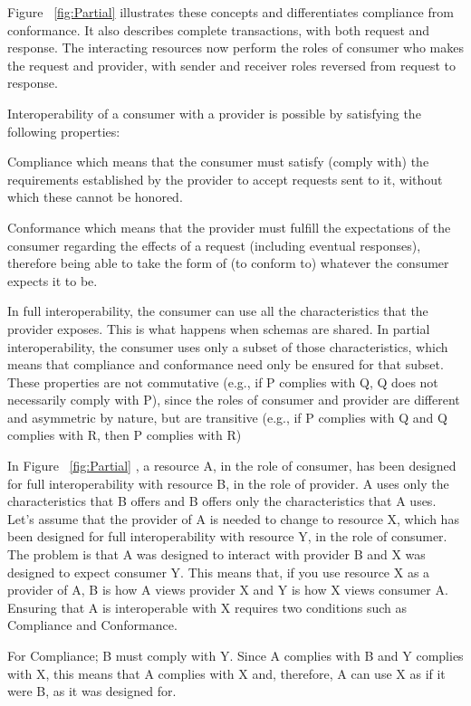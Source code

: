 Figure ~\ref{fig:Partial} illustrates these concepts and differentiates compliance from conformance. It also describes complete transactions, with both request and response. The interacting resources now perform the roles of consumer who makes the request and provider, with sender and receiver roles reversed from request to response.

Interoperability of a consumer with a provider is possible by satisfying the following properties:

Compliance\citep{compliance:def} which means that the consumer must satisfy (comply with) the requirements established by the provider to accept requests sent to it, without which these cannot be honored.

Conformance\citep{comformance:def2} which means that the provider must fulfill the expectations of the consumer
regarding the effects of a request (including eventual responses), therefore being able to take the form
of (to conform to) whatever the consumer expects it to be. 

In full interoperability, the consumer can use all the characteristics that the provider exposes. This is what happens when schemas are shared. In partial interoperability, the consumer uses only a subset of those characteristics, which means that compliance and conformance need only be ensured for that subset. These properties are not commutative (e.g., if P complies with Q, Q does not necessarily comply with P), since the roles of consumer and provider are different and asymmetric by nature, but are transitive (e.g., if P complies with Q and Q complies with R, then P complies with R)

In Figure ~\ref{fig:Partial} , a resource A, in the role of consumer, has been designed for full interoperability with resource B, in the role of provider. A uses only the characteristics that B offers and B offers only the characteristics that A uses. Let's assume that the provider of A is needed to change to resource X, which has been designed for full interoperability with resource Y, in the role of consumer. The problem is that A was designed to interact with provider B and X was designed to expect consumer Y. This means that, if you use resource X as a provider of A, B is how A views provider X and Y is how X views consumer A. Ensuring that A is interoperable with X requires two conditions such as Compliance and Conformance.

For Compliance; B must comply with Y. Since A complies with B and Y complies with X, this means that A complies with X and, therefore, A can use X as if it were B, as it was designed for.


